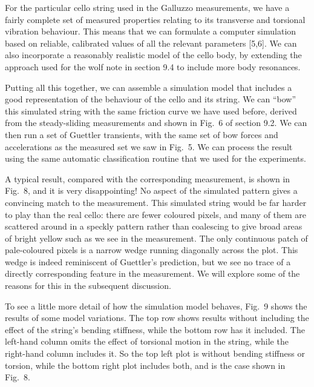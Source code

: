   For the particular cello string used in the Galluzzo measurements, we have a 
  fairly complete set of measured properties relating to its transverse and 
  torsional vibration behaviour. This means that we can formulate a computer 
  simulation based on reliable, calibrated values of all the relevant 
  parameters [5,6]. We can also incorporate a reasonably realistic model of the 
  cello body, by extending the approach used for the wolf note in section 9.4 
  to include more body resonances. 

  Putting all this together, we can assemble a simulation model that includes a 
  good representation of the behaviour of the cello and its string. We can 
  “bow” this simulated string with the same friction curve we have used before, 
  derived from the steady-sliding measurements and shown in Fig.\ 6 of section 
  9.2. We can then run a set of Guettler transients, with the same set of bow 
  forces and accelerations as the measured set we saw in Fig.\ 5. We can 
  process the result using the same automatic classification routine that we 
  used for the experiments. 

  A typical result, compared with the corresponding measurement, is shown in 
  Fig.\ 8, and it is very disappointing! No aspect of the simulated pattern 
  gives a convincing match to the measurement. This simulated string would be 
  far harder to play than the real cello: there are fewer coloured pixels, and 
  many of them are scattered around in a speckly pattern rather than coalescing 
  to give broad areas of bright yellow such as we see in the measurement. The 
  only continuous patch of pale-coloured pixels is a narrow wedge running 
  diagonally across the plot. This wedge is indeed reminiscent of Guettler's 
  prediction, but we see no trace of a directly corresponding feature in the 
  measurement. We will explore some of the reasons for this in the subsequent 
  discussion. 



  To see a little more detail of how the simulation model behaves, Fig.\ 9 
  shows the results of some model variations. The top row shows results without 
  including the effect of the string's bending stiffness, while the bottom row 
  has it included. The left-hand column omits the effect of torsional motion in 
  the string, while the right-hand column includes it. So the top left plot is 
  without bending stiffness or torsion, while the bottom right plot includes 
  both, and is the case shown in Fig.\ 8. 


